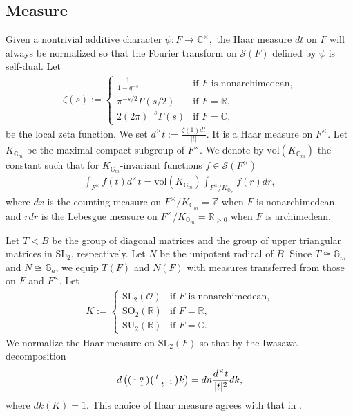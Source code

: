 \documentclass[11pt,a4paper,reqno]{amsart}
\theoremstyle{remark}
\numberwithin{equation}{section}
\newcommand{\SL}{\mathrm{SL}}
\newcommand{\ZZ}{\mathbb{Z}}
\newcommand{\OO}{\mathcal{O}}
\newcommand{\CC}{\mathbb{C}}
\newcommand{\RR}{\mathbb{R}}
\newcommand{\GG}{\mathbb{G}}
\theoremstyle{definition}
\numberwithin{equation}{section}
\newenvironment{psmatrix}
  {\left(\begin{smallmatrix}}
  {\end{smallmatrix}\right)}
\begin{document}
\subsection{Measure}

Given a nontrivial additive character $\psi:F\to \CC^\times,$ the Haar measure $dt$ on $F$ will always be normalized so that the Fourier transform on $\mathcal{S}(F)$ defined by $\psi$ is self-dual. Let
\begin{align*}
    \zeta(s):=\begin{cases}
        \frac{1}{1-q^{-s}} & \textrm{if } F \textrm{ is nonarchimedean,}\\
        \pi^{-s/2}\Gamma(s/2) & \textrm{if } F=\RR,\\
        2(2\pi)^{-s}\Gamma(s) &\textrm{if } F=\CC,
    \end{cases}
\end{align*}
be the local zeta function. We set $d^\times t:=\frac{\zeta(1)dt}{|t|}$. It is a Haar measure on $F^\times$. Let $K_{\GG_m}$ be the maximal compact subgroup of $F^\times.$ We denote by $\mathrm{vol}(K_{\GG_m})$ the constant such that for $K_{\GG_m}$-invariant functions $f\in \mathcal{S}(F^\times)$
\begin{align*}
    \int_{F^\times} f(t)d^\times t=\mathrm{vol}(K_{\GG_m})\int_{F^\times/K_{\GG_m}} f(r)dr,
\end{align*}
where $dx$ is the counting measure on $F^\times/K_{\GG_m}=\ZZ$ when $F$ is nonarchimedean, and $rdr$ is the Lebesgue measure on $F^\times/K_{\GG_m}=\RR_{>0}$ when $F$ is archimedean.

Let $T<B$ be the group of diagonal matrices and the group of upper triangular matrices in $\SL_2$, respectively. Let $N$ be the unipotent radical of $B$. Since $T\cong \GG_m$ and $N\cong \GG_a$, we equip $T(F)$ and $N(F)$ with measures
transferred from those on $F$ and $F^\times$. Let 
\begin{align*}
    K:=\begin{cases}
        \SL_2(\OO) & \textrm{if } F \textrm{ is nonarchimedean,} \\
        \mathrm{SO}_2(\RR) & \textrm{if } F=\RR,\\
        \mathrm{SU}_2(\RR) &\textrm{if } F=\CC.
    \end{cases}
\end{align*}
We normalize the Haar measure on $\SL_2(F)$ so that by the Iwasawa decomposition
\begin{align*}
    d\left(\begin{psmatrix}
        1 & n\\
          & 1
    \end{psmatrix}\begin{psmatrix}
        t & \\
          & t^{-1}
    \end{psmatrix}k\right)=dn\frac{d^\times t}{|t|^2}dk,
\end{align*}
where $dk(K)=1$. This choice of Haar measure agrees with that in \cite{Getz:Quad}.
\end{document}
